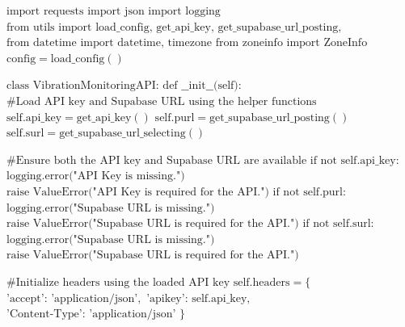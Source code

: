 \begin{algorithmic}[1]
	\STATE $\text{import requests}$
	\STATE $\text{import json}$
	\STATE $\text{import logging}$
	\STATE $\text{from utils import load\_config, get\_api\_key, get\_supabase\_url\_posting, get\_supabase\_url\_selecting}$
	\STATE $\text{from datetime import datetime, timezone}$
	\STATE $\text{from zoneinfo import ZoneInfo}$
	\STATE $\text{config} = \text{load\_config}()$
	
	\STATE
	\STATE $\text{class VibrationMonitoringAPI:}$
	\STATE \hspace{0.5cm} $\text{def \_\_init\_\_(self):}$
	\STATE \hspace{1.0cm} $\text{\# Load API key and Supabase URL using the helper functions}$
	\STATE \hspace{1.0cm} $\text{self.api\_key} = \text{get\_api\_key}()$
	\STATE \hspace{1.0cm} $\text{self.purl} = \text{get\_supabase\_url\_posting}()$
	\STATE \hspace{1.0cm} $\text{self.surl} = \text{get\_supabase\_url\_selecting}()$
	
	\STATE \hspace{1.0cm} $\text{\# Ensure both the API key and Supabase URL are available}$
	\STATE \hspace{1.0cm} $\text{if not self.api\_key:}$
	\STATE \hspace{1.5cm} $\text{logging.error("API Key is missing.")}$
	\STATE \hspace{1.5cm} $\text{raise ValueError("API Key is required for the API.")}$
	\STATE \hspace{1.0cm} $\text{if not self.purl:}$
	\STATE \hspace{1.5cm} $\text{logging.error("Supabase URL is missing.")}$
	\STATE \hspace{1.5cm} $\text{raise ValueError("Supabase URL is required for the API.")}$
	\STATE \hspace{1.0cm} $\text{if not self.surl:}$
	\STATE \hspace{1.5cm} $\text{logging.error("Supabase URL is missing.")}$
	\STATE \hspace{1.5cm} $\text{raise ValueError("Supabase URL is required for the API.")}$
	
	\STATE \hspace{1.0cm} $\text{\# Initialize headers using the loaded API key}$
	\STATE \hspace{1.0cm} $\text{self.headers} = \{$
	\STATE \hspace{1.5cm} $\text{'accept': 'application/json'},$
	\STATE \hspace{1.5cm} $\text{'apikey': self.api\_key},$
	\STATE \hspace{1.5cm} $\text{'Content-Type': 'application/json'}$
	\STATE \hspace{1.0cm} $\}$
	

\end{algorithmic}
